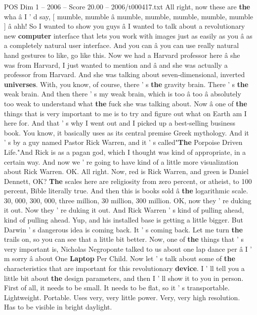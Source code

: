 \begin{textsample}{POS Dim 1 – 2006 – Score 20.00 – 2006/t000417.txt}
All right, now these are \textbf{the} wha â I ' d say, [ mumble, mumble â mumble, mumble, mumble, mumble, mumble ] â ahh!
So I wanted to show you guys â I wanted to talk about a revolutionary new \textbf{computer} interface that lets you work with images just as easily as you â as a completely natural user interface.
And you can â you can use really natural hand gestures to like, go like this.
Now we had a Harvard professor here â she was from Harvard, I just wanted to mention and â and she was actually a professor from Harvard.
And she was talking about seven-dimensional, inverted \textbf{universes}.
With, you know, of course, there ' s \textbf{the} gravity brain.
There ' s \textbf{the} weak brain.
And then there ' s my weak brain, which is too â too â absolutely too weak to understand what \textbf{the} fuck she was talking about.
Now â one of \textbf{the} things that is very important to me is to try and figure out what on Earth am I here for.
And that ' s why I went out and I picked up a best-selling business book.
You know, it basically uses as its central premise Greek mythology.
And it ' s by a guy named Pastor Rick Warren, and it ' s called"\textbf{The} Porpoise Driven Life."And Rick is as a pagan god, which I thought was kind of appropriate, in a certain way.
And now we ' re going to have kind of a little more visualization about Rick Warren.
OK.
All right.
Now, red is Rick Warren, and green is Daniel Dennett, OK? \textbf{The} scales here are religiosity from zero percent, or atheist, to 100 percent, Bible literally true.
And then this is books sold â \textbf{the} logarithmic scale. 30, 000, 300, 000, three million, 30 million, 300 million.
OK, now they ' re duking it out.
Now they ' re duking it out.
And Rick Warren ' s kind of pulling ahead, kind of pulling ahead.
Yup, and his installed base is getting a little bigger.
But Darwin ' s dangerous idea is coming back.
It ' s coming back.
Let me turn \textbf{the} trails on, so you can see that a little bit better.
Now, one of \textbf{the} things that ' s very important is, Nicholas Negroponte talked to us about one lap dance per â I ' m sorry â about One \textbf{Laptop} Per Child.
Now let ' s talk about some of \textbf{the} characteristics that are important for this revolutionary \textbf{device}.
I ' ll tell you a little bit about \textbf{the} design parameters, and then I ' ll show it to you in person.
First of all, it needs to be small.
It needs to be flat, so it ' s transportable.
Lightweight.
Portable.
Uses very, very little power.
Very, very high resolution.
Has to be visible in bright daylight.

\end{textsample}
